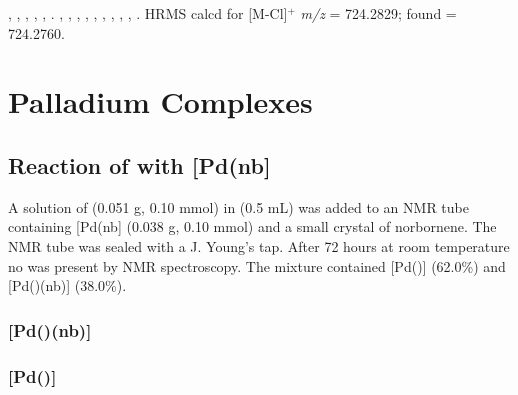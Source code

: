 ,
,
,
,
,
.
,
,
,
,
,
,
,
,
,
.
HRMS calcd for  [M-Cl]$^+$ \emph{m/z} = 724.2829; found = 724.2760.

\section{Palladium Complexes}
\label{section:experimental:palladium}

\subsection*{Reaction of \tButhixantphos{} with [Pd(nb]}

A solution of \tButhixantphos{} (0.051 g, 0.10 mmol) in  (0.5 mL) was added to an NMR tube containing [Pd(nb] (0.038 g, 0.10 mmol) and a small crystal of norbornene.  The NMR tube was sealed with a J. Young's tap.  After 72 hours at room temperature no \tButhixantphos{} was present by \phosphorus{} NMR spectroscopy.  The mixture contained [Pd(\tButhixantphos)] (62.0\%) and [Pd(\tButhixantphos)(nb)] (38.0\%).  

\subsubsection{[Pd(\tButhixantphos)(nb)]}


\subsubsection{[Pd(\tButhixantphos)]}


